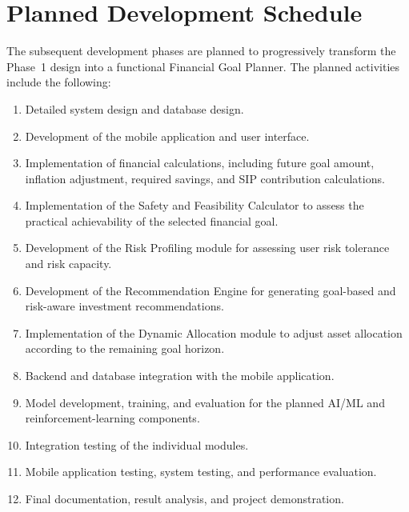 \section{Planned Development Schedule}
The subsequent development phases are planned to progressively transform the Phase~1 design into a functional Financial Goal Planner. The planned activities include the following:
\begin{enumerate}
	\item Detailed system design and database design.
	\item Development of the mobile application and user interface.
	\item Implementation of financial calculations, including future goal amount, inflation adjustment, required savings, and SIP contribution calculations.
	\item Implementation of the Safety and Feasibility Calculator to assess the practical achievability of the selected financial goal.
	\item Development of the Risk Profiling module for assessing user risk tolerance and risk capacity.
	\item Development of the Recommendation Engine for generating goal-based and risk-aware investment recommendations.
	\item Implementation of the Dynamic Allocation module to adjust asset allocation according to the remaining goal horizon.
	\item Backend and database integration with the mobile application.
	\item Model development, training, and evaluation for the planned AI/ML and reinforcement-learning components.
	\item Integration testing of the individual modules.
	\item Mobile application testing, system testing, and performance evaluation.
	\item Final documentation, result analysis, and project demonstration.
\end{enumerate}
